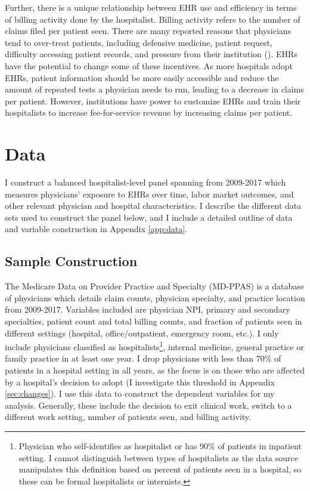 \documentclass[12pt]{article}
\begin{document}
Further, there is a unique relationship between EHR use and efficiency in terms of billing activity done by the hospitalist. Billing activity refers to the number of claims filed per patient seen. There are many reported reasons that physicians tend to over-treat patients, including defensive medicine, patient request, difficulty accessing patient records, and pressure from their institution (\cite{lyu2017overtreatment}). EHRs have the potential to change some of these incentives. As more hospitals adopt EHRs, patient information should be more easily accessible and reduce the amount of repeated tests a physician needs to run, leading to a decrease in claims per patient. However, institutions have power to customize EHRs and train their hospitalists to increase fee-for-service revenue by increasing claims per patient. 





\section{Data}\label{sec:data}

I construct a balanced hospitalist-level panel spanning from 2009-2017 which measures physicians' exposure to EHRs over time, labor market outcomes, and other relevant physician and hospital characteristics. I describe the different data sets used to construct the panel below, and I include a detailed outline of data and variable construction in Appendix \ref{app:data}.

\subsection{Sample Construction}

The Medicare Data on Provider Practice and Specialty (MD-PPAS) is a database of physicians which details claim counts, physician specialty, and practice location from 2009-2017. Variables included are physician NPI, primary and secondary specialties, patient count and total billing counts, and fraction of patients seen in different settings (hospital, office/outpatient, emergency room, etc.). I only include physicians classified as hospitalists\footnote{Physician who self-identifies as hospitalist or has 90\% of patients in inpatient setting. I cannot distinguish between types of hospitalists as the data source manipulates this definition based on percent of patients seen in a hospital, so these can be formal hospitalists or internists.}, internal medicine, general practice or family practice in at least one year. I drop physicians with less than 70\% of patients in a hospital setting in all years, as the focus is on those who are affected by a hospital's decision to adopt (I investigate this threshold in Appendix \ref{sec:changes}). I use this data to construct the dependent variables for my analysis. Generally, these include the decision to exit clinical work, switch to a different work setting, number of patients seen, and billing activity. 
\end{document}
